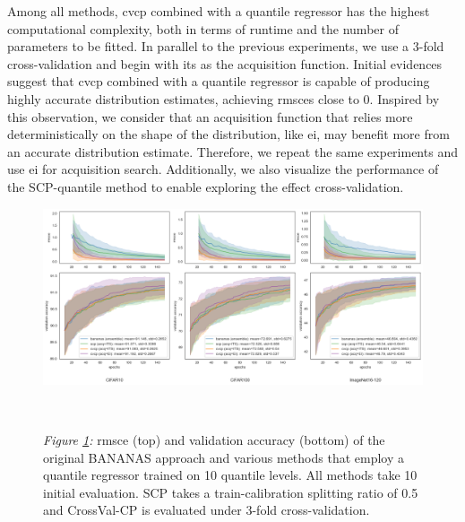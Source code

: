 \documentclass[a4paper,oneside,bibliography=totoc]{scrbook}
\begin{document}
\begin{description}[leftmargin=0cm, listparindent=\parindent]
 	\item[Performance for \gls{cvcp}:] Among all methods, \gls{cvcp} combined with a quantile regressor has the highest computational complexity, both in terms of runtime and the number of parameters to be fitted. In parallel to the previous experiments, we use a 3-fold cross-validation and begin with \gls{its} as the acquisition function. Initial evidences suggest that \gls{cvcp} combined with a quantile regressor is capable of producing highly accurate distribution estimates, achieving \gls{rmsce}s close to 0. Inspired by this observation, we consider that an acquisition function that relies more deterministically on the shape of the distribution, like \gls{ei}, may benefit more from an accurate distribution estimate. Therefore, we repeat the same experiments and use \gls{ei} for acquisition search. Additionally, we also visualize the performance of the SCP-quantile method to enable exploring the effect cross-validation.
 	
 	    \vspace{0.7em}
		\begin{figure}[H]
			\centering
			\includegraphics[scale=0.37 ]{figs/cvcp_quantile.png}
			\label{fig: cvcp_quantile}
			\\
 			\parbox{\linewidth}{
 			\vspace{0.5em}
  			{\small \textit{Figure \ref{fig: cvcp_quantile}:} \gls{rmsce} (top) and validation accuracy (bottom) of the original BANANAS approach and various methods that employ a quantile regressor trained on 10 quantile levels. All methods take 10 initial evaluation. SCP takes a train-calibration splitting ratio of 0.5 and CrossVal-CP is evaluated under 3-fold cross-validation.}
 	 	}	
	\end{figure}	
 	\vspace{0.2em}
 	

\end{description}
\end{document}
